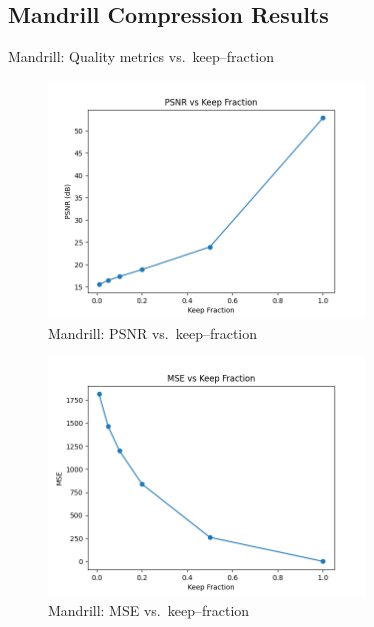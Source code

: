 \documentclass[12pt]{article}
\begin{document}
\subsection{Mandrill Compression Results}

\begin{table}[H]
  \centering
  \caption{Mandrill: Quality metrics vs.\ keep–fraction}
\end{table}

\begin{figure}[H]
  \centering
  \includegraphics[width=0.75\textwidth]{psnr_vs_keep_Mandrill.png}
  \caption{Mandrill: PSNR vs.\ keep–fraction}
\end{figure}

\begin{figure}[H]
  \centering
  \includegraphics[width=0.75\textwidth]{mse_vs_keep_Mandrill.png}
  \caption{Mandrill: MSE vs.\ keep–fraction}
\end{figure}
\end{document}
